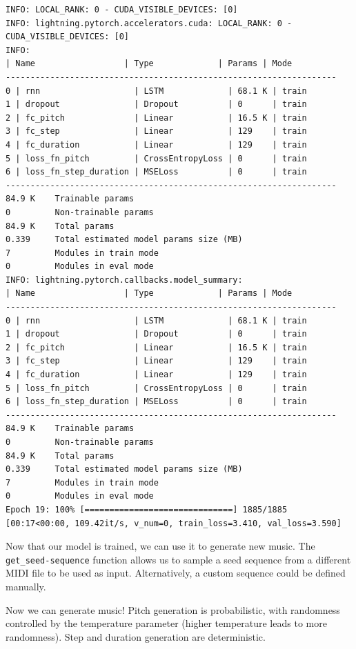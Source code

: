 \documentclass{article}
\begin{document}
\begin{lstlisting}[style=output]
INFO: LOCAL_RANK: 0 - CUDA_VISIBLE_DEVICES: [0]
INFO: lightning.pytorch.accelerators.cuda: LOCAL_RANK: 0 - CUDA_VISIBLE_DEVICES: [0]
INFO: 
| Name                  | Type             | Params | Mode 
-------------------------------------------------------------------
0 | rnn                   | LSTM             | 68.1 K | train
1 | dropout               | Dropout          | 0      | train
2 | fc_pitch              | Linear           | 16.5 K | train
3 | fc_step               | Linear           | 129    | train
4 | fc_duration           | Linear           | 129    | train
5 | loss_fn_pitch         | CrossEntropyLoss | 0      | train
6 | loss_fn_step_duration | MSELoss          | 0      | train
-------------------------------------------------------------------
84.9 K    Trainable params
0         Non-trainable params
84.9 K    Total params
0.339     Total estimated model params size (MB)
7         Modules in train mode
0         Modules in eval mode
INFO: lightning.pytorch.callbacks.model_summary:
| Name                  | Type             | Params | Mode 
-------------------------------------------------------------------
0 | rnn                   | LSTM             | 68.1 K | train
1 | dropout               | Dropout          | 0      | train
2 | fc_pitch              | Linear           | 16.5 K | train
3 | fc_step               | Linear           | 129    | train
4 | fc_duration           | Linear           | 129    | train
5 | loss_fn_pitch         | CrossEntropyLoss | 0      | train
6 | loss_fn_step_duration | MSELoss          | 0      | train
-------------------------------------------------------------------
84.9 K    Trainable params
0         Non-trainable params
84.9 K    Total params
0.339     Total estimated model params size (MB)
7         Modules in train mode
0         Modules in eval mode
Epoch 19: 100% [==============================] 1885/1885 [00:17<00:00, 109.42it/s, v_num=0, train_loss=3.410, val_loss=3.590]
\end{lstlisting}

Now that our model is trained, we can use it to generate new music. The \lstinline{get_seed-sequence} function allows us to sample a seed sequence from a different MIDI file to be used as input. Alternatively, a custom sequence could be defined manually.



Now we can generate music! Pitch generation is probabilistic, with randomness controlled by the temperature parameter (higher temperature leads to more randomness). Step and duration generation are deterministic.
\end{document}
